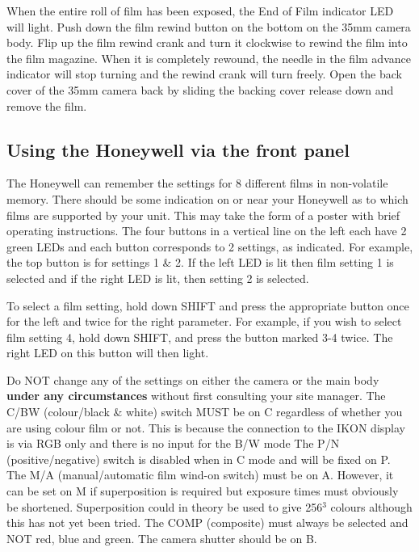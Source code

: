 When the entire roll of film has been exposed, the End of Film indicator LED
will light. Push down the film rewind button on the bottom on the 35mm
camera body. Flip up the film rewind crank and turn it clockwise to
rewind the film into the film magazine.  When it is completely rewound,
the needle in the film advance indicator will stop turning and the rewind crank
will turn freely. Open the back cover of the 35mm camera back by sliding the
backing cover release down and remove the film.

\subsection{Using the Honeywell via the front panel}

The Honeywell can remember the settings for 8 different films in non-volatile
memory. There should be some indication on or near your Honeywell as to which
films are supported by your unit. This may take the form of a poster with brief
operating instructions. The four buttons in a vertical line on the left each
have 2 green LEDs and each button corresponds to 2 settings, as indicated. For
example, the top button is for settings 1 \& 2. If the left LED is lit then
film setting 1 is selected and if the right LED is lit, then setting 2 is
selected.

To select a film setting, hold down SHIFT and press the appropriate
button once for the left and twice for the right parameter. For example, if you
wish to select film setting 4, hold down SHIFT, and press the button marked 3-4
twice. The right LED on this button will then light.

Do NOT change any of the settings on either the camera or the main body {\bf under
any circumstances} without first consulting your site manager. The C/BW
(colour/black \& white) switch MUST be on C regardless of whether you
are using colour film or not. This is because the connection to the IKON
display is via RGB only and there is no input for the B/W mode
The P/N (positive/negative)
switch is disabled when in C mode and will be fixed on P.
The M/A (manual/automatic film wind-on switch) must be on A.
However, it can be set on M if superposition is required but exposure
times must obviously be shortened. Superposition could in theory be used to give
256$^3$ colours although this has not yet been tried.
The COMP (composite) must always be selected and NOT red, blue and
green. The camera shutter should be on B.

